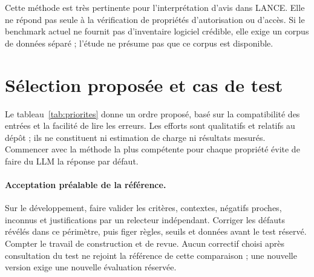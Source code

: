 \documentclass[11pt,a4paper]{article}
\begin{document}
Cette méthode est très pertinente pour l'interprétation d'avis dans LANCE. Elle ne répond pas seule à la vérification de propriétés d'autorisation ou d'accès. Si le benchmark actuel ne fournit pas d'inventaire logiciel crédible, elle exige un corpus de données séparé ; l'étude ne présume pas que ce corpus est disponible.

\section{Sélection proposée et cas de test}
Le tableau~\ref{tab:priorites} donne un ordre proposé, basé sur la compatibilité des entrées et la facilité de lire les erreurs. Les efforts sont qualitatifs et relatifs au dépôt ; ils ne constituent ni estimation de charge ni résultats mesurés. Commencer avec la méthode la plus compétente pour chaque propriété évite de faire du LLM la réponse par défaut.

\paragraph{Acceptation préalable de la référence.}
Sur le développement, faire valider les critères, contextes, négatifs proches, inconnus et justifications par un relecteur indépendant. Corriger les défauts révélés dans ce périmètre, puis figer règles, seuils et données avant le test réservé. Compter le travail de construction et de revue. Aucun correctif choisi après consultation du test ne rejoint la référence de cette comparaison ; une nouvelle version exige une nouvelle évaluation réservée.
\end{document}
